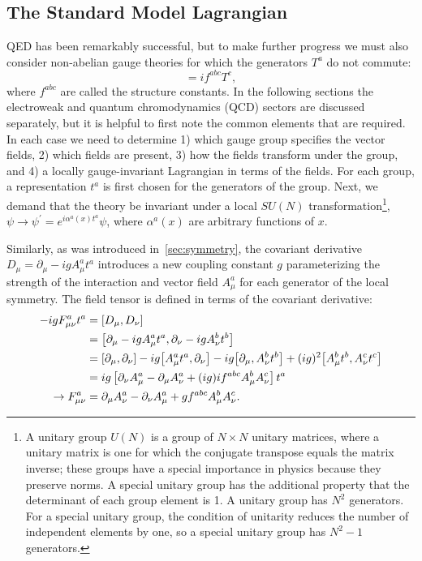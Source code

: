 \subsection{The Standard Model Lagrangian}
QED has been remarkably successful, but to make further progress we must also
consider non-abelian gauge theories for which the generators $T^a$ do not
commute:
\begin{equation}
  [T^a, T^b] = if^{abc} T^c,
  \label{eq:generatorcommutation}
\end{equation}
where $f^{abc}$ are called the structure constants. In the following sections
the electroweak and quantum chromodynamics (QCD) sectors are discussed
separately, but it is helpful to first note the common elements that are
required. In each case we need to determine 1) which gauge group specifies the
vector fields, 2) which fields are present, 3) how the fields transform under
the group, and 4) a locally gauge-invariant Lagrangian in terms of the fields.
For each group, a representation $t^a$ is first chosen for the generators of the
group. Next, we demand that the theory be invariant under a local $SU(N)$
transformation\footnote{A unitary group $U(N)$ is a group of $N \times N$
unitary matrices, where a unitary matrix is one for which the conjugate
transpose equals the matrix inverse; these groups have a special importance in
physics because they preserve norms.  A special unitary group has the additional
property that the determinant of each group element is 1. A unitary group has
$N^2$ generators. For a special unitary group, the condition of unitarity
reduces the number of independent elements by one, so a special unitary group
has $N^2-1$ generators.}, $\psi \rightarrow \psi^\prime = e^{i\alpha^a(x)t^a}
\psi$, where $\alpha^a(x)$ are arbitrary functions of $x$.

Similarly, as was introduced in~\cref{sec:symmetry}, the covariant derivative
$D_\mu = \partial_\mu-igA^a_\mu t^a$ introduces a new coupling constant $g$
parameterizing the strength of the interaction and vector field $A_\mu^a$ for
each generator of the local symmetry. The field tensor is defined in terms of
the covariant derivative:
\begin{align}
  - igF^a_{\mu\nu}t^a
    &= \comm{D_\mu}{D_\nu} \label{eq:fieldtensorcommutator} \\
    &= \comm{\partial_\mu - igA^a_\mu t^a}{\partial_\nu-igA^b_\nu t^b} \\
    &= \comm{\partial_\mu}{\partial_\nu}
      - ig\comm{A_\mu^a t^a}{\partial_\nu}
      - ig\comm{\partial_\mu}{A_\nu^b t^b}
      + (ig)^2\comm{A_\mu^b t^b}{A_\nu^c t^c} \\
    &= ig\left[\partial_\nu A_\mu^a
      - \partial_\mu A_\nu^a
      + (ig)if^{abc}A_\mu^b A_\nu^c \right] t^a \\
    \rightarrow F^a_{\mu\nu}
    &= \partial_\mu A_\nu^a
      - \partial_\nu A_\mu^a
      + gf^{abc}A_\mu^b A_\nu^c.
  \label{eq:fieldtensor}
\end{align}

